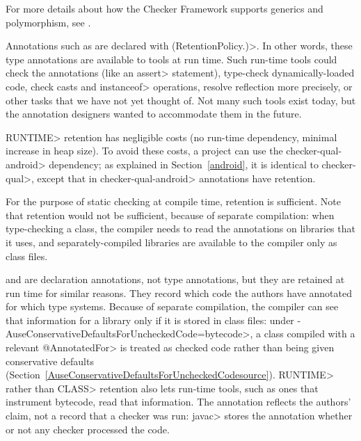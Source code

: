 For more details about how the Checker Framework supports generics and
polymorphism, see .



Annotations such as  are
declared with
\<(RetentionPolicy.)>.  In other words,
these type annotations are available to tools at run time.  Such run-time
tools could check the annotations (like an \<assert> statement), type-check
dynamically-loaded code, check casts and \<instanceof> operations, resolve
reflection more precisely, or other tasks that we have not yet thought of.
Not many such tools exist today, but the annotation designers wanted to
accommodate them in the future.

\<RUNTIME> retention has negligible costs (no run-time dependency, minimal
increase in heap size). To avoid these costs, a project can use the
\<checker-qual-android> dependency; as explained in Section~\ref{android},
it is identical to \<checker-qual>, except that in \<checker-qual-android>
annotations have
retention.

For the purpose of static checking at compile time,
retention is sufficient.  Note that
retention would not be sufficient, because of separate compilation: when
type-checking a class, the compiler needs to read the annotations on
libraries that it uses, and separately-compiled libraries are available to
the compiler only as class files.


 and
 are declaration annotations,
not type annotations, but they are retained at run time for similar
reasons.  They record which code the authors have annotated for which type
systems.  Because of separate compilation, the compiler can see that
information for a library only if it is stored in class files:  under
\<-AuseConservativeDefaultsForUncheckedCode=bytecode>, a class compiled with a
relevant \<@AnnotatedFor> is treated as checked code rather than being given
conservative defaults
(Section~\ref{AuseConservativeDefaultsForUncheckedCodesource}).
\<RUNTIME> rather than \<CLASS> retention also lets run-time tools, such as
ones that instrument bytecode, read that information.  The annotation
reflects the authors' claim, not a record that a checker was run:  \<javac>
stores the annotation whether or not any checker processed the code.


